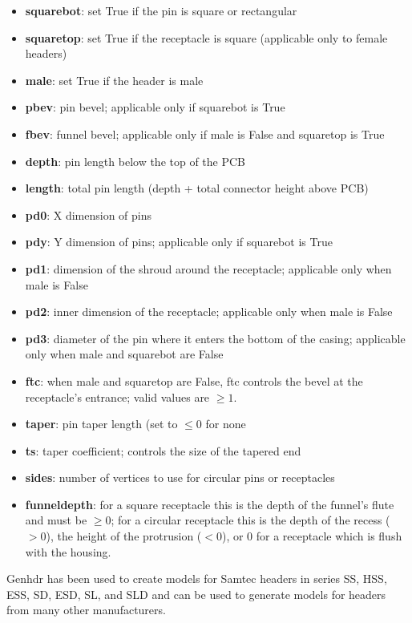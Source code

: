 \begin{itemize}
\item \textbf{squarebot}: set True if the pin is square or rectangular
\item \textbf{squaretop}: set True if the receptacle is square (applicable only to female headers)
\item \textbf{male}: set True if the header is male
\item \textbf{pbev}: pin bevel; applicable only if squarebot is True
\item \textbf{fbev}: funnel bevel; applicable only if male is False and squaretop is True
\item \textbf{depth}: pin length below the top of the PCB
\item \textbf{length}: total pin length (depth + total connector height above PCB)
\item \textbf{pd0}: X dimension of pins
\item \textbf{pdy}: Y dimension of pins; applicable only if squarebot is True
\item \textbf{pd1}: dimension of the shroud around the receptacle; applicable only when male is False
\item \textbf{pd2}: inner dimension of the receptacle; applicable only when male is False
\item \textbf{pd3}: diameter of the pin where it enters the bottom of the casing; applicable only when
    male and squarebot are False
\item \textbf{ftc}: when male and squaretop are False, ftc controls the bevel at the receptacle's entrance;
    valid values are $\ge1$.
\item \textbf{taper}: pin taper length (set to $\le0$ for none
\item \textbf{ts}: taper coefficient; controls the size of the tapered end
\item \textbf{sides}: number of vertices to use for circular pins or receptacles
\item \textbf{funneldepth}: for a square receptacle this is the depth of the funnel's flute and must be $\ge0$;
    for a circular receptacle this is the depth of the recess ($>0$), the height of the protrusion ($<0$),
    or 0 for a receptacle which is flush with the housing.
\end{itemize}

Genhdr has been used to create models for Samtec headers in series SS, HSS, ESS, SD, ESD, SL, and SLD
and can be used to generate models for headers from many other manufacturers.

